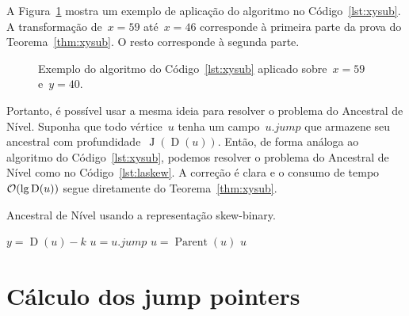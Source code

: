 \documentclass[main.tex]{subfiles}
\newcommand{\Par}{\operatorname{Parent}}
\newcommand{\Dep}{\operatorname{D}}
\newcommand{\CSB}{\textit{CSB}}
\newcommand{\J}{\operatorname{J}}
\begin{document}
A Figura~\ref{fig:exxysub} mostra um exemplo de aplicação do algoritmo no Código~\ref{lst:xysub}. A transformação de~$x = 59$ até~$x = 46$ corresponde à primeira parte da prova do Teorema~\ref{thm:xysub}. O resto corresponde à segunda parte.

\begin{figure}[H]
\caption{Exemplo do algoritmo do Código~\ref{lst:xysub} aplicado sobre~$x = 59$ e~$y = 40$.} \label{fig:exxysub}
\end{figure}

\newcommand{\jmp}{\mathit{jump}}
Portanto, é possível usar a mesma ideia para resolver o problema do Ancestral de Nível. Suponha que todo vértice~$u$ tenha um campo~$u.\jmp$ que armazene seu ancestral com profundidade~$\J(\Dep(u))$. Então, de forma análoga ao algoritmo do Código~\ref{lst:xysub}, podemos resolver o problema do Ancestral de Nível como no Código~\ref{lst:laskew}. A correção é clara e o consumo de tempo~$\Oh(\lg\Dep(u))$ segue diretamente do Teorema~\ref{thm:xysub}.

\begin{algorithm}
\caption{Ancestral de Nível usando a representação skew-binary.} \label{lst:laskew}
\begin{algorithmic}[1]
		\State $y = \Dep(u) - k$
		\While{$\Dep(u) \neq y$}
			\If{$\Dep(u.\jmp) \geq y$}
				\State $u = u.\jmp$
			\Else
				\State $u = \Par(u)$
			\EndIf
		\EndWhile
		\State \Return $u$
	\EndFunction
\end{algorithmic}
\end{algorithm}

\section{Cálculo dos jump pointers}
\end{document}
